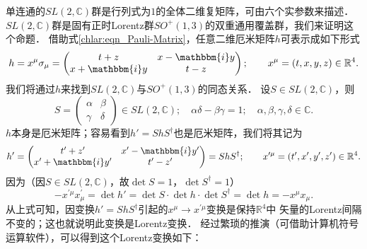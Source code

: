 单连通的$SL(2,\mathbb{C})$群是行列式为$1$的全体二维复矩阵，可由六个实参数来描述．
$SL(2,\mathbb{C})$群是固有正时Lorentz群$SO^{+}(1,3)$的双重通用覆盖群，我们来证明这个命题．
借助式\eqref{chlar:eqn_Pauli-Matrix}，任意二维厄米矩阵$h$可表示成如下形式
\begin{equation}\label{chlar:eqn_hslso}
    h = x^\mu \sigma_\mu
    =\begin{pmatrix}
        t+z & x- \mathbbm{i} y \\ x+ \mathbbm{i} y & t-z
    \end{pmatrix}; 
    \qquad x^\mu= (t,x,y,z) \in \mathbb{R}^4 .
\end{equation}
我们将通过$h$来找到$SL(2,\mathbb{C})$与$SO^{+}(1,3)$的同态关系．
设$S\in SL(2,\mathbb{C})$，则
\begin{equation}\label{chlar:eqn_sl2}
    S=\begin{pmatrix} \alpha & \beta \\ \gamma & \delta \end{pmatrix} \in SL(2,\mathbb{C}) ; 
    \quad \alpha \delta - \beta \gamma =1; 
    \quad \alpha , \beta ,\gamma , \delta \in \mathbb{C} .
\end{equation}
$h$本身是厄米矩阵；容易看到$h'=ShS^\dagger$也是厄米矩阵，我们将其记为
\begin{equation}\label{chlar:eqn_hpslso}
    h' =\begin{pmatrix}
        t'+z' & x'- \mathbbm{i} y' \\ x'+ \mathbbm{i} y' &   t'-z'
    \end{pmatrix} =ShS^\dagger; 
    \qquad x^{\prime\mu}= (t',x',y',z') \in \mathbb{R}^4 .
\end{equation}
因为（因$S\in SL(2,\mathbb{C})$，故$\det S=1$，$\det S^\dagger=1$）
\begin{equation}\label{chlar:eqn_hx}
    -x^{\prime\mu} x^{\prime}_\mu=\det h' = \det S \cdot \det h \cdot \det S^\dagger = \det h = -x^{\mu}x_\mu .
\end{equation}
从上式可知，因变换$h'=ShS^\dagger$引起的$x^\mu \to x^{\prime\mu}$变换是保持$\mathbb{R}^4$中
矢量的Lorentz间隔不变的；这也就说明此变换是Lorentz变换．
经过繁琐的推演（可借助计算机符号运算软件），可以得到这个Lorentz变换如下：
